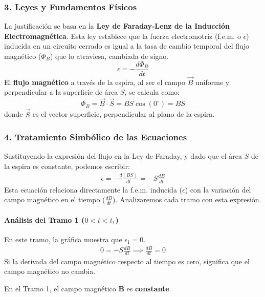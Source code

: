 \subsubsection*{3. Leyes y Fundamentos Físicos}
La justificación se basa en la \textbf{Ley de Faraday-Lenz de la Inducción Electromagnética}. Esta ley establece que la fuerza electromotriz (f.e.m. o $\epsilon$) inducida en un circuito cerrado es igual a la tasa de cambio temporal del flujo magnético ($\Phi_B$) que lo atraviesa, cambiada de signo.
$$ \epsilon = -\frac{d\Phi_B}{dt} $$
El \textbf{flujo magnético} a través de la espira, al ser el campo $\vec{B}$ uniforme y perpendicular a la superficie de área $S$, se calcula como:
$$ \Phi_B = \vec{B} \cdot \vec{S} = B S \cos(0^\circ) = B S $$
donde $\vec{S}$ es el vector superficie, perpendicular al plano de la espira.

\subsubsection*{4. Tratamiento Simbólico de las Ecuaciones}
Sustituyendo la expresión del flujo en la Ley de Faraday, y dado que el área $S$ de la espira es constante, podemos escribir:
\begin{gather}
    \epsilon = -\frac{d(B S)}{dt} = -S \frac{dB}{dt}
\end{gather}
Esta ecuación relaciona directamente la f.e.m. inducida ($\epsilon$) con la variación del campo magnético en el tiempo ($\frac{dB}{dt}$). Analizaremos cada tramo con esta expresión.

\paragraph*{Análisis del Tramo 1 ($0 < t < t_1$)}
En este tramo, la gráfica muestra que $\epsilon_1 = 0$.
\begin{gather}
    0 = -S \frac{dB}{dt} \implies \frac{dB}{dt} = 0
\end{gather}
Si la derivada del campo magnético respecto al tiempo es cero, significa que el campo magnético no cambia.
\begin{cajaresultado}
    En el Tramo 1, el campo magnético $\boldsymbol{B}$ es \textbf{constante}.
\end{cajaresultado}


